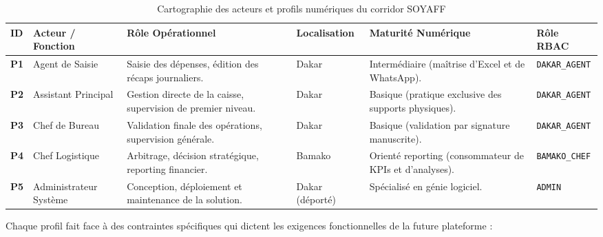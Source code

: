 \begin{table}[htbp]
\centering
\footnotesize
\caption{Cartographie des acteurs et profils numériques du corridor SOYAFF}
\label{tab:cartographie_acteurs}
\begin{tabularx}{\linewidth}{|>{\raggedright\arraybackslash}p{0.8cm}|>{\raggedright\arraybackslash}X|>{\raggedright\arraybackslash}X|>{\raggedright\arraybackslash}p{2.0cm}|>{\raggedright\arraybackslash}X|>{\raggedright\arraybackslash}p{2.3cm}|}
\hline
\rowcolor[HTML]{EFEFEF}
\textbf{ID} & \textbf{Acteur / Fonction} & \textbf{Rôle Opérationnel} & \textbf{Localisation} & \textbf{Maturité Numérique} & \textbf{Rôle RBAC} \\ \hline
\textbf{P1} & Agent de Saisie & Saisie des dépenses, édition des récaps journaliers. & Dakar & Intermédiaire (maîtrise d'Excel et de WhatsApp). & \texttt{DAKAR\_AGENT} \\ \hline
\textbf{P2} & Assistant Principal & Gestion directe de la caisse, supervision de premier niveau. & Dakar & Basique (pratique exclusive des supports physiques). & \texttt{DAKAR\_AGENT} \\ \hline
\textbf{P3} & Chef de Bureau & Validation finale des opérations, supervision générale. & Dakar & Basique (validation par signature manuscrite). & \texttt{DAKAR\_AGENT} \\ \hline
\textbf{P4} & Chef Logistique & Arbitrage, décision stratégique, reporting financier. & Bamako & Orienté reporting (consommateur de KPIs et d'analyses). & \texttt{BAMAKO\_CHEF} \\ \hline
\textbf{P5} & Administra\-teur Système & Conception, déploiement et maintenance de la solution. & Dakar (déporté) & Spécialisé en génie logiciel. & \texttt{ADMIN} \\ \hline
\end{tabularx}
\end{table}

Chaque profil fait face à des contraintes spécifiques qui dictent les exigences fonctionnelles de la future plateforme :

